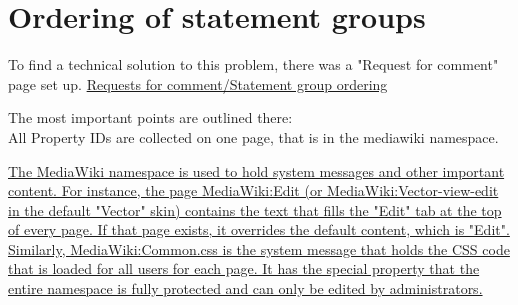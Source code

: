 \documentclass[11pt]{article}
\begin{document}
\section{Ordering of statement groups}

To find a technical solution to this problem, there was a "Request for comment" page set up. \href{https://www.mediawiki.org/wiki/Requests_for_comment/Statement_group_ordering}{Requests for comment/Statement group ordering}

The most important points are outlined there: \\
All Property IDs are collected on one page, that is in the mediawiki namespace. 

\href{https://www.mediawiki.org/wiki/Help:Namespaces#MediaWiki}{The MediaWiki namespace is used to hold system messages and other important content. For instance, the page MediaWiki:Edit (or MediaWiki:Vector-view-edit in the default "Vector" skin) contains the text that fills the "Edit" tab at the top of every page. If that page exists, it overrides the default content, which is "Edit". Similarly, MediaWiki:Common.css is the system message that holds the CSS code that is loaded for all users for each page. It has the special property that the entire namespace is fully protected and can only be edited by administrators.} 
\end{document}
